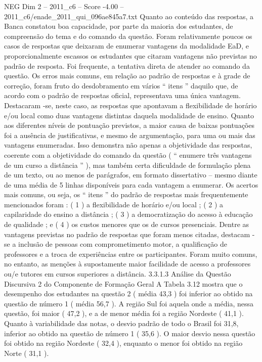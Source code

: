 \begin{textsample}{NEG Dim 2 – 2011\_c6 – Score -4.00 – 2011\_c6/enade\_2011\_qui\_096ae845a7.txt}
Quanto ao conteúdo das respostas, a Banca constatou boa capacidade, por parte da maioria dos estudantes, de compreensão do tema e do comando da questão.
Foram relativamente poucos os casos de respostas que deixaram de enumerar vantagens da modalidade EaD, e proporcionalmente escassos os estudantes que citaram vantagens não previstas no padrão de resposta.
Foi frequente, a tentativa direta de atender ao comando da questão.
Os erros mais comuns, em relação ao padrão de respostas e à grade de correção, foram fruto do desdobramento em vários “ itens ” daquilo que, de acordo com o padrão de respostas oficial, representava uma única vantagem.
Destacaram -se, neste caso, as respostas que apontavam a flexibilidade de horário e/ou local como duas vantagens distintas daquela modalidade de ensino.
Quanto aos diferentes níveis de pontuação previstos, a maior causa de baixas pontuações foi a ausência de justificativas, e mesmo de argumentação, para uma ou mais das vantagens enumeradas.
Isso demonstra não apenas a objetividade das respostas, coerente com a objetividade do comando da questão ( “ enumere três vantagens de um curso a distância ” ), mas também certa dificuldade de formulação plena de um texto, ou ao menos de parágrafos, em formato dissertativo – mesmo diante de uma média de 5 linhas disponíveis para cada vantagem a enumerar.
Os acertos mais comuns, ou seja, os “ itens ” do padrão de respostas mais frequentemente mencionados foram : ( 1 ) a flexibilidade de horário e/ou local ; ( 2 ) a capilaridade do ensino a distância ; ( 3 ) a democratização do acesso à educação de qualidade ; e ( 4 ) os custos menores que os de cursos presenciais.
Dentre as vantagens previstas no padrão de respostas que foram menos citadas, destacam -se a inclusão de pessoas com comprometimento motor, a qualificação de professores e a troca de experiências entre os participantes.
Foram muito comuns, no entanto, as menções à supostamente maior facilidade de acesso a professores ou/e tutores em cursos superiores a distância. 3.3.1.3 Análise da Questão Discursiva 2 do Componente de Formação Geral A Tabela 3.12 mostra que o desempenho dos estudantes na questão 2 ( média 43,3 ) foi inferior ao obtido na questão de número 1 ( média 56,7 ).
A região Sul foi aquela onde a média, nessa questão, foi maior ( 47,2 ), e a de menor média foi a região Nordeste ( 41,1 ).
Quanto à variabilidade das notas, o desvio padrão de todo o Brasil foi 31,8, inferior ao obtido na questão de número 1 ( 35,6 ).
O maior desvio nessa questão foi obtido na região Nordeste ( 32,4 ), enquanto o menor foi obtido na região Norte ( 31,1 ).

\end{textsample}
